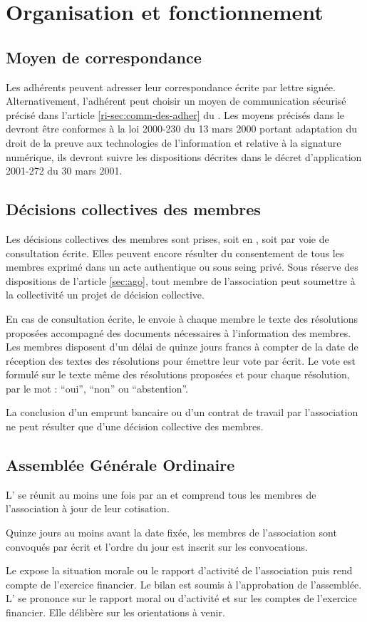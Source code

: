 \documentclass[a4paper,french,10pt]{article}
\newcommand{\article}[1]{\subsection{#1}\addtocounter{article}{1}}
\newcounter{article}
\newcommand{\artref}[1]{article \ref{#1}}
\newcommand{\artrefri}[1]{article \ref{ri-#1} du \RI{}}
\begin{document}
\section{Organisation et fonctionnement}

\article{Moyen de correspondance}
\label{sec:moyen-de-corresp}
Les adhérents peuvent adresser leur correspondance écrite par lettre signée. Alternativement, l'adhérent peut choisir un moyen de communication sécurisé précisé dans l'\artrefri{sec:comm-des-adher}. Les moyens précisés dans le \RI{} devront être conformes à la loi 2000-230 du 13 mars 2000 portant adaptation du droit de la preuve aux technologies de l'information et relative à la signature numérique, ils devront suivre les dispositions décrites dans le décret d'application 2001-272 du 30 mars 2001. 

\article{Décisions collectives des membres}
\label{sec:decisions-collectives}

Les décisions collectives des membres sont prises, soit en \AG{}, soit
par voie de consultation écrite. Elles peuvent encore résulter du
consentement de tous les membres exprimé dans un acte authentique ou
sous seing privé. Sous réserve des dispositions de l’\artref{sec:ago},
tout membre de l’association peut soumettre à la collectivité un
projet de décision collective.

En cas de consultation écrite, le \bureau{} envoie à chaque membre le
texte des résolutions proposées accompagné des documents nécessaires à
l’information des membres. Les membres disposent d’un délai de quinze
jours francs à compter de la date de réception des textes des
résolutions pour émettre leur vote par écrit. Le vote est formulé sur
le texte même des résolutions proposées et pour chaque résolution, par
le mot : “oui”, “non” ou “abstention”.

La conclusion d’un emprunt bancaire ou d’un contrat de travail par
l’association ne peut résulter que d’une décision collective des
membres.

\article{Assemblée Générale Ordinaire}
\label{sec:ago}
L’\AGO{} se réunit au moins une fois par an et comprend tous les membres de l’association à jour de leur cotisation.

Quinze jours au moins avant la date fixée, les membres de
l’association sont convoqués par écrit et l’ordre du jour est inscrit
sur les convocations.


Le \bureau{} expose la situation morale ou le rapport d'activité de
l'association puis rend compte de l'exercice financier. Le bilan est
soumis à l'approbation de l'assemblée. 
L’\AG{} se prononce sur le rapport moral ou d’activité et sur les comptes de l’exercice financier. Elle délibère sur les orientations à venir.
\end{document}
